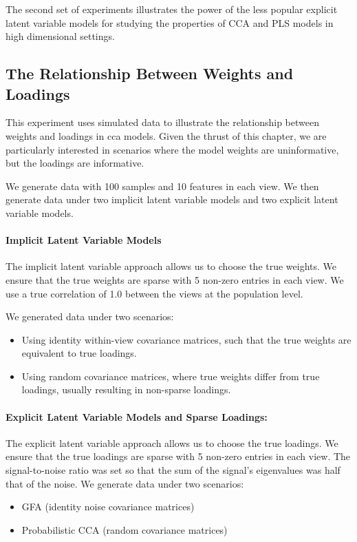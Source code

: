 The second set of experiments illustrates the power of the less popular explicit latent variable models for studying the properties of CCA and PLS models in high dimensional settings.

\subsection{The Relationship Between Weights and Loadings}

This experiment uses simulated data to illustrate the relationship between weights and \gls{loadings} in \acrshort{cca} models.
Given the thrust of this chapter, we are particularly interested in scenarios where the model weights are uninformative, but the \gls{loadings} are informative.

We generate data with 100 samples and 10 features in each view.
We then generate data under two implicit latent variable models and two explicit latent variable models.

\paragraph{Implicit Latent Variable Models}
The implicit latent variable approach allows us to choose the true weights.
We ensure that the true weights are sparse with 5 non-zero entries in each view.
We use a true correlation of 1.0 between the views at the population level.

We generated data under two scenarios:
\begin{itemize}
    \item Using identity within-view covariance matrices, such that the true weights are equivalent to true loadings.
    \item Using random covariance matrices, where true weights differ from true loadings, usually resulting in non-sparse loadings.
\end{itemize}

\paragraph{Explicit Latent Variable Models and Sparse Loadings:}
The explicit latent variable approach allows us to choose the true \gls{loadings}.
We ensure that the true \gls{loadings} are sparse with 5 non-zero entries in each view.
The signal-to-noise ratio was set so that the sum of the signal's eigenvalues was half that of the noise.
We generate data under two scenarios:
\begin{itemize}
    \item GFA (identity noise covariance matrices)
    \item Probabilistic CCA (random covariance matrices)
\end{itemize}


